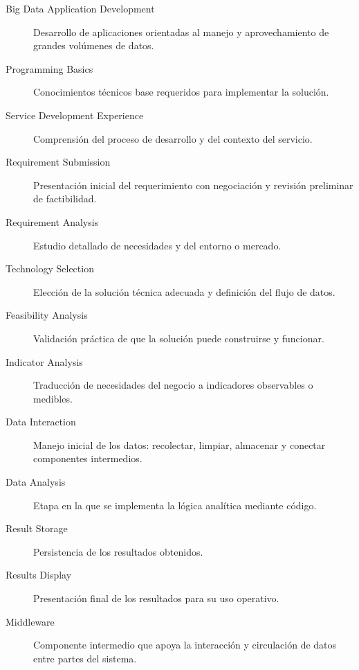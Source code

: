 \documentclass[8pt,a4paper,twocolumn]{article}
\begin{document}
\begin{description}
    \item[Big Data Application Development] Desarrollo de aplicaciones orientadas al manejo y aprovechamiento de grandes volúmenes de datos.
    \item[Programming Basics] Conocimientos técnicos base requeridos para implementar la solución.
    \item[Service Development Experience] Comprensión del proceso de desarrollo y del contexto del servicio.
    \item[Requirement Submission] Presentación inicial del requerimiento con negociación y revisión preliminar de factibilidad.
    \item[Requirement Analysis] Estudio detallado de necesidades y del entorno o mercado.
    \item[Technology Selection] Elección de la solución técnica adecuada y definición del flujo de datos.
    \item[Feasibility Analysis] Validación práctica de que la solución puede construirse y funcionar.
    \item[Indicator Analysis] Traducción de necesidades del negocio a indicadores observables o medibles.
    \item[Data Interaction] Manejo inicial de los datos: recolectar, limpiar, almacenar y conectar componentes intermedios.
    \item[Data Analysis] Etapa en la que se implementa la lógica analítica mediante código.
    \item[Result Storage] Persistencia de los resultados obtenidos.
    \item[Results Display] Presentación final de los resultados para su uso operativo.
    \item[Middleware] Componente intermedio que apoya la interacción y circulación de datos entre partes del sistema.
\end{description}
\end{document}
